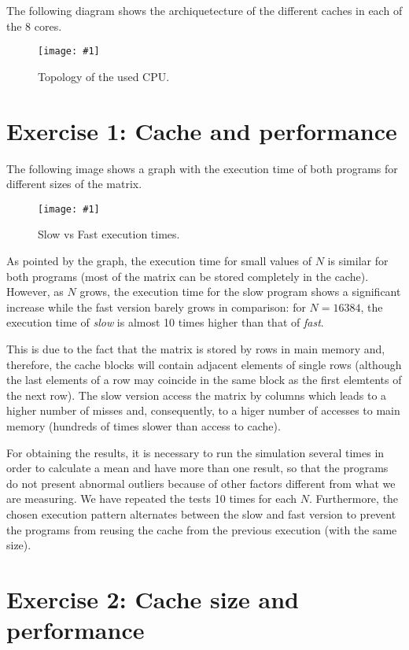 \documentclass{article}
\newcommand{\myFigure}[4]{%
    \begin{figure}[!ht]
        \texttt{[image: \#1]}
        \centering
        \caption{#2}
        \label{#3}
    \end{figure}
}
\begin{document}
\pagebreak

The following diagram shows the archiquetecture of the different caches in each of the 8 cores. 

\myFigure{../material_P3/out0/mv/figure.png}{Topology of the used CPU.}
{topology}{0.63}

\pagebreak

\section*{Exercise 1: Cache and performance}

The following image shows a graph with the execution time of both programs for different sizes of the matrix.

\myFigure{../material_P3/out1/mv_att4/slow_fast_time.png}{Slow vs Fast execution times.}{slow_fast_times}{0.65}

As pointed by the graph, the execution time for small values of $N$ is similar for both programs (most of the matrix can be stored completely in the cache). However, as $N$ grows, the execution time for the slow program shows a significant increase while the fast version barely grows in comparison: for $N=16384$, the execution time of \emph{slow} is almost 10 times higher than that of \emph{fast}.

This is due to the fact that the matrix is stored by rows in main memory and, therefore, the cache blocks will contain adjacent elements of single rows (although the last elements of a row may coincide in the same block as the first elemtents of the next row). The slow version access the matrix by columns which leads to a higher number of misses and, consequently, to a higer number of accesses to main memory (hundreds of times slower than access to cache). 

For obtaining the results, it is necessary to run the simulation several times in order to calculate a mean and have more than one result, so that the programs do not present abnormal outliers because of other factors different from what we are measuring. We have repeated the tests 10 times for each $N$. Furthermore, the chosen execution pattern alternates between the slow and fast version to prevent the programs from reusing the cache from the previous execution (with the same size).

\pagebreak

\section*{Exercise 2: Cache size and performance}
\end{document}

